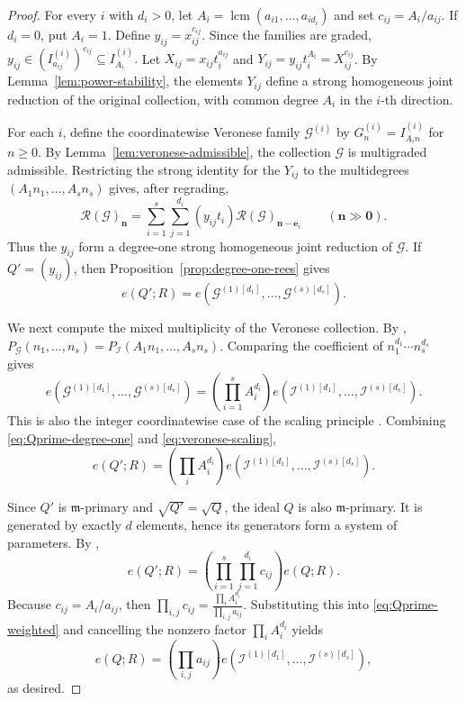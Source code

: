 \documentclass[reqno,12pt]{amsart}
\theoremstyle{plain}
\theoremstyle{definition}
\theoremstyle{remark}
\numberwithin{equation}{section}
\begin{document}
\begin{proof}
For every $i$ with $d_i>0$, let
$A_i=\operatorname{lcm}(a_{i1},\ldots,a_{id_i})$ and set
$c_{ij}=A_i/a_{ij}$. If $d_i=0$, put $A_i=1$. Define
$y_{ij}=x_{ij}^{c_{ij}}$. Since the families are graded, $y_{ij}\in(I_{a_{ij}}^{(i)})^{c_{ij}}
\subseteq I_{A_i}^{(i)}.$
Let $X_{ij}=x_{ij}t_i^{a_{ij}}$ and
$Y_{ij}=y_{ij}t_i^{A_i}=X_{ij}^{c_{ij}}$. By
Lemma~\ref{lem:power-stability}, the elements $Y_{ij}$ define a strong
homogeneous joint reduction of the original collection, with common
degree $A_i$ in the $i$-th direction.

For each $i$, define the coordinatewise Veronese family $\mathcal G^{(i)}$ by
$G_n^{(i)}=I_{A_in}^{(i)}$ for $n\geq0$. By
Lemma~\ref{lem:veronese-admissible}, the collection
$\boldsymbol{\mathcal G}$ is multigraded admissible. Restricting the
strong identity for the $Y_{ij}$ to the multidegrees
$(A_1n_1,\ldots,A_sn_s)$ gives, after regrading,
\[
\mathcal R(\boldsymbol{\mathcal G})_{\mathbf n}
=
\sum_{i=1}^{s}\sum_{j=1}^{d_i}
(y_{ij}t_i)
\mathcal R(\boldsymbol{\mathcal G})_{\mathbf n-\mathbf e_i}
\qquad(\mathbf n\gg\mathbf0).
\]
Thus the $y_{ij}$ form a degree-one strong homogeneous joint reduction
of $\boldsymbol{\mathcal G}$. If $Q'=(y_{ij})$, then
Proposition~\ref{prop:degree-one-rees} gives
\begin{equation}
\label{eq:Qprime-degree-one}
e(Q';R)
=
e\!\left(\mathcal G^{(1)[d_1]},\ldots,
\mathcal G^{(s)[d_s]}\right).
\end{equation}

We next compute the mixed multiplicity of the Veronese collection. By
\cite[Theorem~1.6]{Cutkosky2026}, $P_{\boldsymbol{\mathcal G}}(n_1,\ldots,n_s)
=
P_{\boldsymbol{\mathcal I}}(A_1n_1,\ldots,A_sn_s).$
Comparing the coefficient of $n_1^{d_1}\cdots n_s^{d_s}$ gives
\begin{equation}
\label{eq:veronese-scaling}
e\!\left(\mathcal G^{(1)[d_1]},\ldots,
\mathcal G^{(s)[d_s]}\right)
=
\left(\prod_{i=1}^{s}A_i^{d_i}\right)
e\!\left(\mathcal I^{(1)[d_1]},\ldots,
\mathcal I^{(s)[d_s]}\right).
\end{equation}
This is also the integer coordinatewise case of the scaling principle
\cite[Lemma~3.3]{Cutkosky2026}. Combining
\eqref{eq:Qprime-degree-one} and \eqref{eq:veronese-scaling},
\begin{equation}
\label{eq:Qprime-weighted}
e(Q';R)
=
\left(\prod_iA_i^{d_i}\right)
e\!\left(\mathcal I^{(1)[d_1]},\ldots,
\mathcal I^{(s)[d_s]}\right).
\end{equation}

Since $Q'$ is $\mathfrak m$-primary and
$\sqrt{Q'}=\sqrt Q$, the ideal $Q$ is also $\mathfrak m$-primary. It is
generated by exactly $d$ elements, hence its generators form a system of
parameters. By \cite[Proposition~11.2.9(2)]{SwansonHuneke},
\[
e(Q';R)
=
\left(\prod_{i=1}^{s}\prod_{j=1}^{d_i}c_{ij}\right)e(Q;R).
\]
Because $c_{ij}=A_i/a_{ij}$, then $\prod_{i,j}c_{ij}
=
\frac{\prod_iA_i^{d_i}}{\prod_{i,j}a_{ij}}.$
Substituting this into \eqref{eq:Qprime-weighted} and cancelling the
nonzero factor $\prod_iA_i^{d_i}$ yields
\[
e(Q;R)
=
\left(\prod_{i,j}a_{ij}\right)
e\!\left(\mathcal I^{(1)[d_1]},\ldots,
\mathcal I^{(s)[d_s]}\right),
\]
as desired.
\end{proof}
\end{document}
